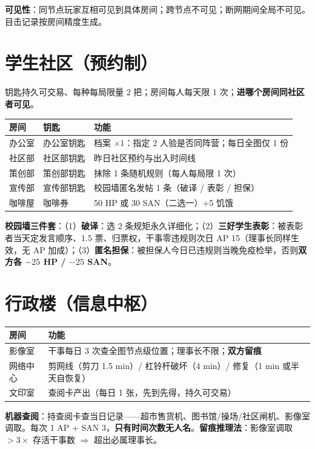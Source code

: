 \documentclass[UTF8, fontset=none, 11pt]{ctexart}
\begin{document}
\textbf{可见性}：同节点玩家互相可见到具体房间；跨节点不可见；断网期间全局不可见。目击记录按房间精度生成。

\section{学生社区（预约制）}
钥匙持久可交易、每种每局限量 2 把；房间每人每天限 1 次；\textbf{进哪个房间同社区者可见}。
\begin{center}
\begin{tabular}{lll}
\toprule
房间 & 钥匙 & 功能 \\
\midrule
办公室 & 办公室钥匙 & 档案 $\times 1$：指定 2 人验是否同阵营；每日全图仅 1 份 \\
社区部 & 社区部钥匙 & 昨日社区预约与出入时间线 \\
策创部 & 策创部钥匙 & 抹除 1 条随机规则（每人每局限 1 次） \\
宣传部 & 宣传部钥匙 & 校园墙匿名发帖 1 条（破译 / 表彰 / 担保） \\
咖啡屋 & 咖啡券 & 50 HP 或 30 SAN（二选一）+5 饥饿 \\
\bottomrule
\end{tabular}
\end{center}

\textbf{校园墙三件套}：（1）\textbf{破译}：选 2 条规矩永久详细化；（2）\textbf{三好学生表彰}：被表彰者当天定发言顺序、1.5 票、归票权，干事零违规则次日 AP 15（理事长同样生效，无 AP 加成）；（3）\textbf{匿名担保}：被担保人今日已违规则当晚免疫检举，否则\textbf{双方各 $-25$ HP / $-25$ SAN}。

\section{行政楼（信息中枢）}
\begin{center}
\begin{tabular}{ll}
\toprule
房间 & 功能 \\
\midrule
影像室 & 干事每日 3 次查全图节点级位置；理事长不限；\textbf{双方留痕} \\
网络中心 & 剪网线（剪刀 1.5 min）/ 杠铃杆破坏（4 min）/ 修复（1 min 或半天自恢复） \\
文印室 & 查阅卡产出（每日 1 张，先到先得，持久可交易） \\
\bottomrule
\end{tabular}
\end{center}

\textbf{机器查阅}：持查阅卡查当日记录——超市售货机、图书馆/操场/社区闸机、影像室调取。每次 1 AP + SAN 3，\textbf{只有时间次数无人名}。\textbf{留痕推理法}：影像室调取 $> 3 \times$ 存活干事数 $\Rightarrow$ 超出必属理事长。
\end{document}
